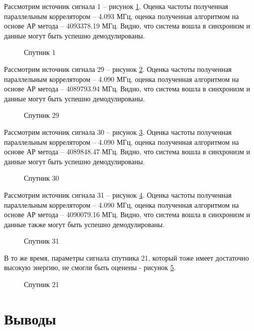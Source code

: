 Рассмотрим источник сигнала 1 – рисунок \ref{pic:5mhz_sat_1}. Оценка частоты полученная параллельным коррелятором – 4.093 МГц,
оценка полученная алгоритмом на основе АР метода – 4093378.19 МГц. Видно, что система вошла в синхронизм и данные могут быть успешно демодулированы.
\begin{figure}[H]
\center{}
	\caption{Спутник 1}
	\label{pic:5mhz_sat_1}
\end{figure}

Рассмотрим источник сигнала 29 – рисунок \ref{pic:5mhz_sat_29}. Оценка частоты полученная параллельным коррелятором – 4.090 МГц,
оценка полученная алгоритмом на основе АР метода – 4089793.94 МГц. Видно, что система вошла в синхронизм и данные могут быть успешно демодулированы.
\begin{figure}[H]
\center{}
	\caption{Спутник 29}
	\label{pic:5mhz_sat_29}
\end{figure}

Рассмотрим источник сигнала 30 – рисунок \ref{pic:5mhz_sat_30}. Оценка частоты полученная параллельным коррелятором – 4.090 МГц,
оценка полученная алгоритмом на основе АР метода – 4089848.47 МГц. Видно, что система вошла в синхронизм и данные могут быть успешно демодулированы.
\begin{figure}[H]
\center{}
	\caption{Спутник 30}
	\label{pic:5mhz_sat_30}
\end{figure}

Рассмотрим источник сигнала 31 – рисунок \ref{pic:5mhz_sat_31}. Оценка частоты полученная параллельным коррелятором – 4.090 МГц,
оценка полученная алгоритмом на основе АР метода – 4090079.16 МГц. Видно, что система вошла в синхронизм и данные также могут быть успешно демодулированы.
\begin{figure}[H]
\center{}
	\caption{Спутник 31}
	\label{pic:5mhz_sat_31}
\end{figure}

В то же время, параметры сигнала спутника 21, который тоже имеет достаточно высокую энергию, не смогли быть оценены - рисунок \ref{pic:5mhz_sat_21}.
\begin{figure}[H]
\center{}
	\caption{Спутник 21}
	\label{pic:5mhz_sat_21}
\end{figure}


\section{Выводы}

\newpage
